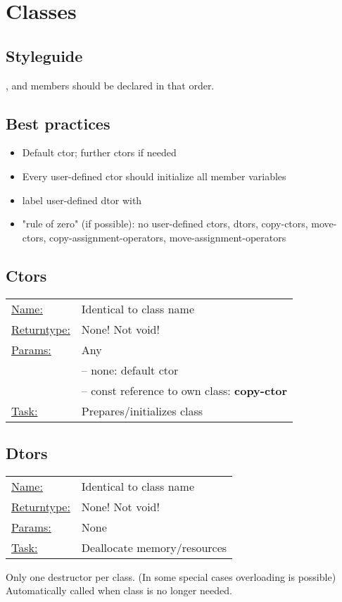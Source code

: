 \section{Classes}
    \vspace{-2mm}
	\vspace{-2mm}

\subsection{Styleguide}
    ,  and  members should be declared in that order.

\subsection{Best practices}
    \begin{itemize}
        \item Default ctor; further ctors if needed
        \item Every user-defined ctor should initialize all member variables
        \item label user-defined dtor with 
        \item "rule of zero" (if possible): no user-defined ctors, dtors, copy-ctors, move-ctors, copy-assignment-operators, move-assignment-operators
    \end{itemize}

\subsection{Ctors}
    \begin{tabularx}{\columnwidth}{@{}l X@{}}
        \underline{Name:}          &Identical to class name\\
        \underline{Returntype:}    &None! Not void!\\
        \underline{Params:}        &Any\\
                            &-- none: default ctor\\
                            &-- const reference to own class: \textbf{copy-ctor}\\
        \underline{Task:}          &Prepares/initializes class
    \end{tabularx}

\subsection{Dtors}
    \begin{tabularx}{\columnwidth}{@{}l X@{}}
        \underline{Name:}          &Identical to class name\\
        \underline{Returntype:}    &None! Not void!\\
        \underline{Params:}        &None\\
        \underline{Task:}          &Deallocate memory/resources
    \end{tabularx}
    Only one destructor per class. (In some special cases overloading is possible)\newline
    Automatically called when class is no longer needed.
    

